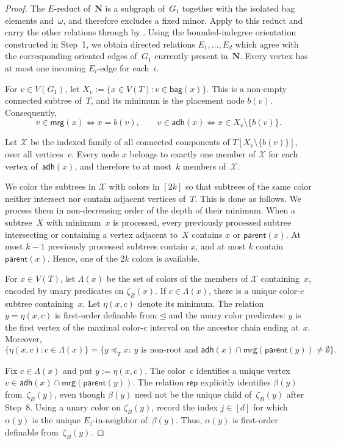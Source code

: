 \documentclass[1p,number,11pt]{elsarticle}
\theoremstyle{plain}
\newcommand{\bag}{\mathsf{bag}}
\newcommand{\mrg}{\mathsf{mrg}}
\newcommand{\adh}{\mathsf{adh}}
\newcommand{\parent}{\mathsf{parent}}
\begin{document}
\begin{proof}
The $E$-reduct of~$\mathbf N$ is a subgraph of~$G_1$ together with the isolated bag elements and~$\omega$, and therefore excludes a fixed minor.
Apply  to this reduct and carry the other relations through by .
Using the bounded-indegree orientation constructed in Step~1, we obtain directed relations $E_1,\ldots,E_d$ which agree with the corresponding oriented edges of~$G_1$ currently present in~$\mathbf N$.
Every vertex has at most one incoming $E_i$-edge for each~$i$.

For $v\in V(G_1)$, let
$X_v:=\{x\in V(T):v\in\bag(x)\}$.
This is a non-empty connected subtree of~$T$, and its minimum is the placement
node $b(v)$.  Consequently,
\[
 v\in\mrg(x)\Longleftrightarrow x=b(v),
 \qquad
 v\in\adh(x)\Longleftrightarrow x\in X_v\setminus\{b(v)\}.
\]

Let $\mathscr X$ be the indexed family of all connected components of
$T[X_v\setminus\{b(v)\}]$, over all vertices~$v$.  Every node $x$ belongs to
exactly one member of $\mathscr X$ for each vertex of~$\adh(x)$, and therefore
to at most~$k$ members of~$\mathscr X$.

We color the subtrees in $\mathscr X$ with colors in $[2k]$ so that subtrees
of the same color neither intersect nor contain adjacent vertices of~$T$.
This is done as follows. We process them in non-decreasing order of the depth of their minimum.  When a
subtree~$X$ with minimum~$x$ is processed, every previously processed subtree
intersecting or containing a vertex adjacent to~$X$ contains $x$ or
$\parent(x)$.  At most $k-1$ previously processed subtrees contain
$x$, and at most $k$ contain $\parent(x)$.  Hence, one of the $2k$ colors is
available.

For $x\in V(T)$, let $\Lambda(x)$ be the set of colors of the members of
$\mathscr X$ containing~$x$, encoded by unary predicates on
$\zeta_B(x)$.  If $c\in\Lambda(x)$, there is a unique color-$c$ subtree
containing~$x$. Let $\eta(x,c)$ denote its minimum.  The relation
$y=\eta(x,c)$ is first-order definable from $\unlhd$ and the unary color
predicates: $y$ is the first vertex of the maximal color-$c$ interval on the
ancestor chain ending at~$x$.  Moreover,
\[
 \{\eta(x,c):c\in\Lambda(x)\}
 =\{y\preceq_T x:\ y\text{ is non-root and }
       \adh(x)\cap\mrg(\parent(y))\neq\emptyset\}.
\]

Fix $c\in\Lambda(x)$ and put $y:=\eta(x,c)$.  The color~$c$ identifies a
unique vertex $v\in\adh(x)\cap\mrg(\parent(y))$.  The relation
$\mathsf{rep}$ explicitly identifies $\beta(y)$ from~$\zeta_B(y)$, even
though $\beta(y)$ need not be the unique child of~$\zeta_B(y)$ after Step~8.
Using a unary color on $\zeta_B(y)$, record the index $j\in[d]$ for which
$\alpha(y)$ is the unique $E_j$-in-neighbor of~$\beta(y)$.  Thus,
$\alpha(y)$ is first-order definable from~$\zeta_B(y)$.


\end{proof}
\end{document}
